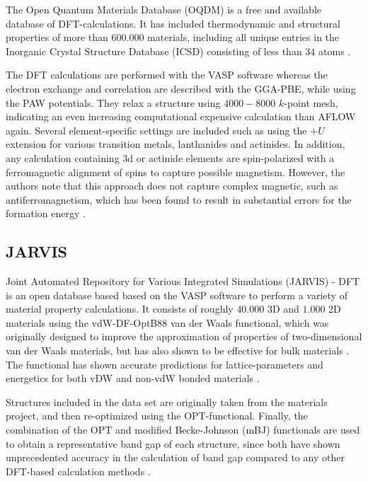 The Open Quantum Materials Database (OQDM) \cite{Saal2013, Kirklin2015} is a free and available database of DFT-calculations. It has included thermodynamic and structural properties of more than $600.000$ materials, including all unique entries in the Inorganic Crystal Structure Database (ICSD) consisting of less than $34$ atoms \cite{Ferrenti2020}.

The DFT calculations are performed with the VASP software whereas the electron exchange and correlation are described with the GGA-PBE, while using the PAW potentials. They relax a structure using $4000-8000$ $k$-point mesh, indicating an even increasing computational expensive calculation than AFLOW again. Several element-specific settings are included such as using the $+U$ extension for various transition metals, lanthanides and actinides. In addition, any calculation containing 3d or actinide elements are spin-polarized with a ferromagnetic alignment of spins to capture possible magnetism. However, the authors note that this approach does not capture complex magnetic, such as antiferromagnetism, which has been found to result in substantial errors for the formation energy \cite{Stevanovic2012}.

\subsection{JARVIS}

Joint Automated Repository for Various Integrated Simulations (JARVIS) \cite{Choudhary2020} - DFT is an open database based based on the VASP software to perform a variety of material property calculations. It consists of roughly $40.000$ 3D and $1.000$ 2D materials using the vdW-DF-OptB88 van der Waals functional, which was originally designed to improve the approximation of properties of two-dimensional van der Waals materials, but has also shown to be effective for bulk materials \cite{Thonhauser2007, Klimes2011}. The functional has shown accurate predictions for lattice-parameters and energetics for both vDW and non-vdW bonded materials  \cite{Choudhary2018}.

Structures included in the data set are originally taken from the materials project, and then re-optimized using the OPT-functional. Finally, the combination of the OPT and modified Becke-Johnson (mBJ) functionals are used to obtain a representative band gap of each structure, since both have shown unprecedented accuracy in the calculation of band gap compared to any other DFT-based calculation methods \cite{Choudhary2018a}.

